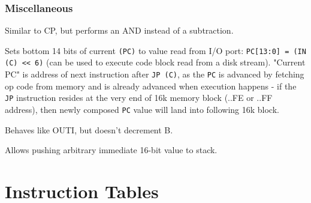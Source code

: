 \documentclass[oneside,a4paper]{book}
\begin{document}
\subsection{Miscellaneous}

\begin{description}


	Similar to CP, but performs an AND instead of a subtraction.
	

	Sets bottom 14 bits of current {\tt (PC)} to value read from I/O port: {\tt PC[13:0] = (IN (C) << 6)} (can be used to execute code block read from a disk stream). "Current PC" is address of next instruction after {\tt JP (C)}, as the {\tt PC} is advanced by fetching op code from memory and is already advanced when execution happens - if the {\tt JP} instruction resides at the very end of 16k memory block (..FE or ..FF address), then newly composed {\tt PC} value will land into following 16k block.


	Behaves like OUTI, but doesn't decrement B.


	Allows pushing arbitrary immediate 16-bit value to stack.

\end{description}




\chapter{Instruction Tables}

\newcommand{\instrheader}{
	\hline
		
		& 
		Symbolic &
		\multicolumn{8}{c}{Flags} & 
		\multicolumn{3}{c}{Opcode} &
		& & 
		M & 
		T & \\

		Mnemonic & 
		Operation &
		SF & ZF & YF & HF & XF & PF & NF & CF &
		76 & 543 & 210 & 
		Hex & Bytes & 
		Cycles & States & 
		Comments \\

	\hline
}

\startcontents[intrstructionsections]
\end{document}
